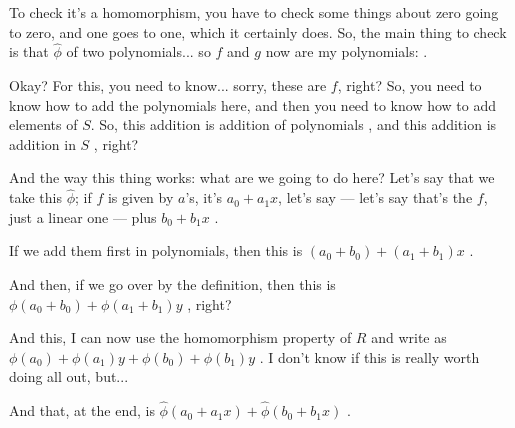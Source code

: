 \begin{proofWrapper}
\begin{hidden}
\end{hidden}

\begin{speech}[00:12:20 - 00:14:25]
To check it's a homomorphism, you have to check some things about zero going to zero, and one goes to one, which it certainly does. So, the main thing to check is that $\hat{\phi}$ of two polynomials... so $f$ and $g$ now are my polynomials: .

Okay? For this, you need to know... sorry, these are $f$, right? So, you need to know how to add the polynomials here, and then you need to know how to add elements of $S$. So, this addition is addition of polynomials , and this addition is addition in $S$ , right?

And the way this thing works: what are we going to do here? Let's say that we take this $\hat{\phi}$; if $f$ is given by $a$'s, it's $a_0 + a_1 x$, let's say --- let's say that's the $f$, just a linear one --- plus $b_0 + b_1 x$ .

If we add them first in polynomials, then this is $(a_0 + b_0) + (a_1 + b_1) x$ .

And then, if we go over by the definition, then this is $\phi(a_0 + b_0) + \phi(a_1 + b_1) y$ , right?
\end{speech}

\begin{speech}[00:14:25 - 00:16:30]
And this, I can now use the homomorphism property of $R$ and write as $\phi(a_0) + \phi(a_1) y + \phi(b_0) + \phi(b_1) y$ . I don't know if this is really worth doing all out, but...

And that, at the end, is $\hat{\phi}(a_0 + a_1 x) + \hat{\phi}(b_0 + b_1 x)$ .


\end{speech}
\end{proofWrapper}
